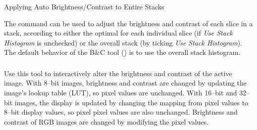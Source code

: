 \begin{infobox}
\caption{\label{infobox:AutoB&C-stacks}Applying Auto Brightness/Contrast to
Entire Stacks}


The 
command can be used to adjust the brightness
and contrast of each slice in a stack, according to either the optimal
for each individual slice (if \emph{Use Stack Histogram} is unchecked)
or the overall stack (by ticking \emph{Use Stack Histogram}). The
default behavior of the B\&C tool ()
is to use the overall stack histogram.
\end{infobox}



\subsubsection{\protect{}\label{sub:Brightness/Contrast...[C]}}

Use this tool to interactively alter the brightness and contrast of
the active image. With 8--bit images, brightness and contrast are
changed by updating the image's lookup table (LUT), so pixel values
are unchanged. With 16--bit and 32--bit images, the display is updated
by changing the mapping from pixel values to 8--bit display values,
so pixel pixel values are also unchanged. Brightness and contrast
of RGB images are changed by modifying the pixel values.

